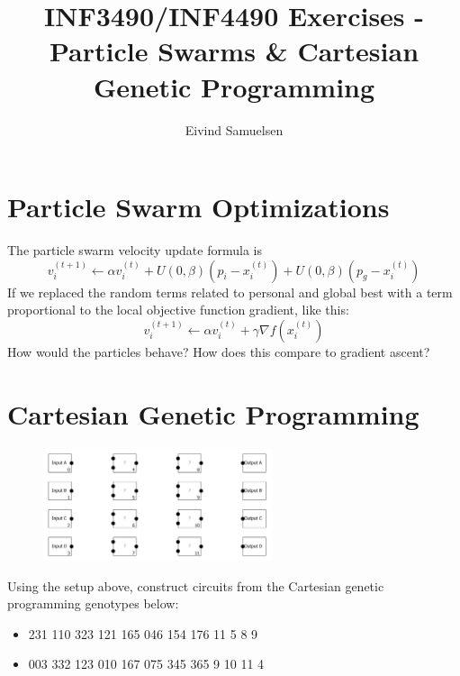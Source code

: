 
\title{\vspace{-2cm}INF3490/INF4490 Exercises - Particle Swarms \& Cartesian Genetic Programming}
\author{Eivind Samuelsen}
\date{}

\setlength\parindent{0pt}


    \renewcommand\marginsymbol[1][0pt]{%
  \tabto*{0cm}\makebox[-1cm][c]{$\mathbb{P}$}\tabto*{\TabPrevPos}}

\maketitle


\section{Particle Swarm Optimizations}
The particle swarm velocity update formula is
\begin{equation}
    v_i^{(t+1)} \leftarrow \alpha v_i ^{(t)} + U(0,\beta)(p_i-x_i^{(t)}) + U(0,\beta)(p_g - x_i^{(t)})
\end{equation}
If we replaced the random terms related to personal and global best with a term proportional to the local objective function gradient, like this:
\begin{equation}
    v_i^{(t+1)} \leftarrow \alpha v_i ^{(t)} + \gamma \nabla f(x_i^{(t)})
\end{equation}
How would the particles behave? How does this compare to gradient ascent?

\section{Cartesian Genetic Programming}
\begin{figure}[H]
\begin{center}
\includegraphics[width=0.6\textwidth]{cartesian.png}
\end{center}
\end{figure}
Using the setup above, construct circuits from the Cartesian genetic programming genotypes below:
\begin{itemize}
    \item 231 110 323 121 165 046 154 176 11 5 8 9
    \item 003 332 123 010 167 075 345 365 9 10 11 4
\end{itemize}




